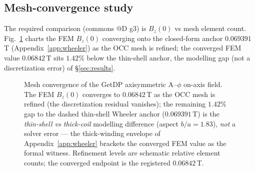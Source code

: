 \subsection{Mesh-convergence study}
\label{app:getdp-mesh}

The required comparison (commons @D g3) is $B_z(0)$ vs mesh element count.
Fig.~\ref{fig:mesh-conv} charts the FEM $B_z(0)$ converging onto the
closed-form anchor $0.069391$\,T (Appendix~\ref{app:wheeler}) as the OCC
mesh is refined; the converged FEM value $0.06842$\,T sits $1.42$\% below
the thin-shell anchor, the modelling gap (not a discretization error) of
\S\ref{sec:results}.

\begin{figure}[h]
\centering
{}
\caption{Mesh convergence of the GetDP axisymmetric A--$\phi$ on-axis
field. The FEM $B_z(0)$ converges to $0.06842$\,T as the OCC mesh is
refined (the discretization residual vanishes); the remaining $1.42$\% gap
to the dashed thin-shell Wheeler anchor ($0.069391$\,T) is the
\emph{thin-shell vs thick-coil} modelling difference (aspect
$b/a\!=\!1.83$), \emph{not} a solver error --- the thick-winding envelope
of Appendix~\ref{app:wheeler} brackets the converged FEM value as the
formal witness. Refinement levels are schematic relative element counts;
the converged endpoint is the registered $0.06842$\,T.}
\label{fig:mesh-conv}
\end{figure}

